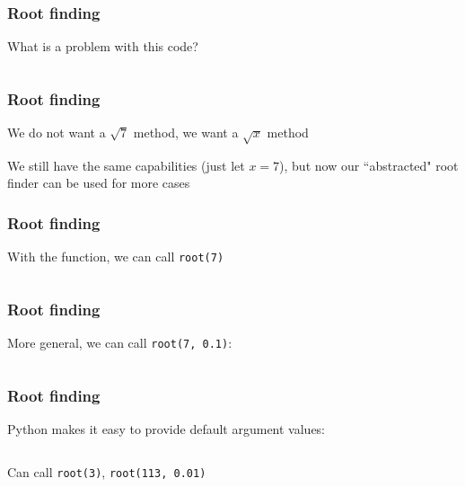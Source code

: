 \documentclass{beamer}
\begin{document}
\begin{frame}
\frametitle{Root finding}

What is a problem with this code?

\begin{center}
\begin{tabular}{c}

\end{tabular}
\end{center}

\end{frame}

\begin{frame}
\frametitle{Root finding}
We do not want a $\sqrt{7}$ method, we want a $\sqrt{x}$ method

\vspace{0.2in}

We still have the same capabilities (just let $x = 7$), but now our ``abstracted" root finder can be used for more cases
\end{frame}


\begin{frame}
\frametitle{Root finding}

With the function, we can call \texttt{root(7)}

\begin{center}
\begin{tabular}{c}

\end{tabular}
\end{center}

\end{frame}

\begin{frame}
\frametitle{Root finding}
More general, we can call \texttt{root(7, 0.1)}:

\begin{center}
\begin{tabular}{c}

\end{tabular}
\end{center}

\end{frame}


\begin{frame}
\frametitle{Root finding}
Python makes it easy to provide default argument values:

\begin{center}
\begin{tabular}{c}

\end{tabular}
\end{center}

Can call \texttt{root(3)}, \texttt{root(113, 0.01)}
\end{frame}
\end{document}
